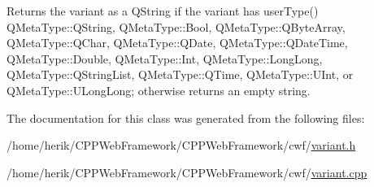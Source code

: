Returns the variant as a Q\+String if the variant has user\+Type() Q\+Meta\+Type\+::\+Q\+String, Q\+Meta\+Type\+::\+Bool, Q\+Meta\+Type\+::\+Q\+Byte\+Array, Q\+Meta\+Type\+::\+Q\+Char, Q\+Meta\+Type\+::\+Q\+Date, Q\+Meta\+Type\+::\+Q\+Date\+Time, Q\+Meta\+Type\+::\+Double, Q\+Meta\+Type\+::\+Int, Q\+Meta\+Type\+::\+Long\+Long, Q\+Meta\+Type\+::\+Q\+String\+List, Q\+Meta\+Type\+::\+Q\+Time, Q\+Meta\+Type\+::\+U\+Int, or Q\+Meta\+Type\+::\+U\+Long\+Long; otherwise returns an empty string. 



The documentation for this class was generated from the following files\+:\begin{DoxyCompactItemize}
\item 
/home/herik/\+C\+P\+P\+Web\+Framework/\+C\+P\+P\+Web\+Framework/cwf/\hyperlink{variant_8h}{variant.\+h}\item 
/home/herik/\+C\+P\+P\+Web\+Framework/\+C\+P\+P\+Web\+Framework/cwf/\hyperlink{variant_8cpp}{variant.\+cpp}\end{DoxyCompactItemize}
